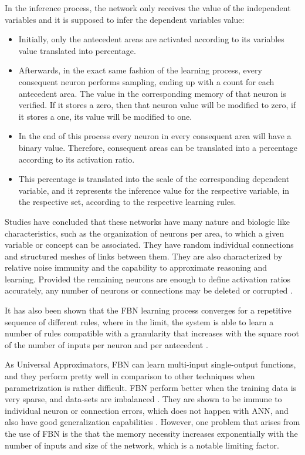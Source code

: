 In the inference process, the network only receives the value of the independent variables and it is supposed to infer the dependent variables value:
\begin{itemize}
\item Initially, only the antecedent areas are activated according to its variables value translated into percentage. 
\item Afterwards, in the exact same fashion of the learning process, every consequent neuron performs sampling, ending up with a count for each antecedent area. The value in the corresponding memory of that neuron is verified. If it stores a zero, then that neuron value will be modified to zero, if it stores a one, its value will be modified to one.
\item In the end of this process every neuron in every consequent area will have a binary value. Therefore, consequent areas can be translated into a percentage according to its activation ratio. 
\item This percentage is translated into the scale of the corresponding dependent variable, and it represents the inference value for the respective variable, in the respective set, according to the respective learning rules.
\end{itemize}

Studies have concluded that these networks have many nature and biologic like characteristics, such as the organization of neurons per area, to which a given variable or concept can be associated. They have random individual connections and structured meshes of links between them. They are also characterized by relative noise immunity and the capability to approximate reasoning and learning. Provided the remaining neurons are enough to define activation ratios accurately, any number of neurons or connections may be deleted or corrupted \cite{Tome2014}.

It has also been shown that the FBN learning process converges for a repetitive sequence of different rules, where in the limit, the system is able to learn a number of rules compatible with a granularity that increases with the square root of the number of inputs per neuron and per antecedent \cite{Carvalho2002}.

As Universal Approximators, FBN can learn multi-input single-output functions, and they perform pretty well in comparison to other techniques when parametrization is rather difficult. FBN perform better when the training data is very sparse, and data-sets are imbalanced \cite{Carvalho2007}. They are shown to be immune to individual neuron or connection errors, which does not happen with \ac{ANN}, and also have good generalization capabilities \cite{Carvalho2007}.
However, one problem that arises from the use of FBN is the that the memory necessity increases exponentially with the number of inputs and size of the network, which is a notable limiting factor.

